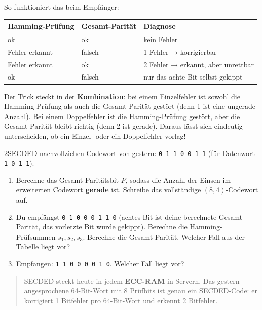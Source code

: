So funktioniert das beim Empfänger:

\begin{center}
\begin{tabular}{llp{6cm}}
  \toprule
  Hamming-Prüfung & Gesamt-Parität & Diagnose \\
  \midrule
  ok             & ok             & kein Fehler \\
  Fehler erkannt & falsch         & 1 Fehler → korrigierbar \\
  Fehler erkannt & ok             & 2 Fehler → erkannt, aber unrettbar \\
  ok             & falsch         & nur das achte Bit selbst gekippt \\
  \bottomrule
\end{tabular}
\end{center}

Der Trick steckt in der \textbf{Kombination}: bei einem Einzelfehler
ist sowohl die Hamming-Prüfung als auch die Gesamt-Parität gestört
(denn 1 ist eine ungerade Anzahl). Bei einem Doppelfehler ist die
Hamming-Prüfung gestört, aber die Gesamt-Parität bleibt richtig (denn
2 ist gerade). Daraus lässt sich eindeutig unterscheiden, ob ein
Einzel- oder ein Doppelfehler vorlag!

\begin{bleistiftuebung}{2}{SECDED nachvollziehen}
Codewort von gestern: \texttt{0 1 1 0 0 1 1} (für Datenwort
\texttt{1 0 1 1}).

\begin{enumerate}[label=(\alph*), leftmargin=*]
\item Berechne das Gesamt-Paritätsbit $P$, sodass die Anzahl der
  Einsen im erweiterten Codewort \textbf{gerade} ist. Schreibe das
  vollständige $(8,4)$-Codewort auf.
\item Du empfängst \texttt{0 1 0 0 0 1 1 0} (achtes Bit ist deine
  berechnete Gesamt-Parität, das vorletzte Bit wurde gekippt).
  Berechne die Hamming-Prüfsummen $s_1, s_2, s_3$. Berechne die
  Gesamt-Parität. Welcher Fall aus der Tabelle liegt vor?
\item Empfangen: \texttt{1 1 0 0 0 0 1 0}. Welcher Fall liegt vor?
\end{enumerate}
\end{bleistiftuebung}

\begin{quote}
SECDED steckt heute in jedem \textbf{ECC-RAM} in Servern. Das gestern
angesprochene 64-Bit-Wort mit 8 Prüfbits ist genau ein SECDED-Code:
er korrigiert 1 Bitfehler pro 64-Bit-Wort und erkennt 2 Bitfehler.
\end{quote}

